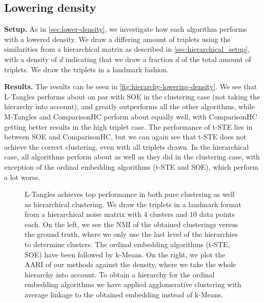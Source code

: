 \subsection{Lowering density}\label{sec:hierarchicall-lower-density}
\textbf{Setup.} As in \autoref{sec:lower-density}, we investigate how each algorithm performs with a lowered density. We draw a differing amount of triplets
using the similarities from a hierarchical matrix as described in \autoref{sec:hierarchical_setup}, with a density of $d$ indicating that we draw a fraction $d$ of the total amount of triplets.
We draw the triplets in a landmark fashion. 

\noindent
\textbf{Results.}
The results can be seen in \autoref{fig:hierarchy-lowering-density}. 
We see that L-Tangles performs about on par with SOE in the clustering case (not taking the hierarchy into account), 
and greatly outperforms all the other algorithms, while M-Tangles and ComparisonHC perform about equally well, with ComparisonHC getting better results in the high triplet case.
The performance of t-STE lies in between SOE and ComparisonHC, but we can again see that t-STE does not achieve the correct clustering, even with all triplets drawn.
In the hierarchical case, all algorithms perform about as well as they did in the clustering case, with exception of the ordinal embedding algorithms (t-STE and SOE), which perform a lot worse.

\begin{figure}[ht]
    \centering
    \caption{
        L-Tangles achieves top performance in both pure clustering as well as hierarchical clustering. 
        We draw the triplets in a landmark format from a hierarchical noise matrix with $4$ clusters and $10$ data points each. On the left, we see the NMI of 
        the obtained clusterings versus the ground truth, where we only use the last level of the hierarchies to determine clusters. The ordinal embedding algorithms
        (t-STE, SOE) have been followed by k-Means. On the right, 
        we plot the AARI of our methods against the density, where we take the whole hierarchy into account. To obtain a hierarchy for the ordinal embedding algorithms
        we have applied agglomerative clustering with average linkage to the obtained embedding instead of k-Means.
    }
    \label{fig:hierarchy-lowering-density}
\end{figure}

